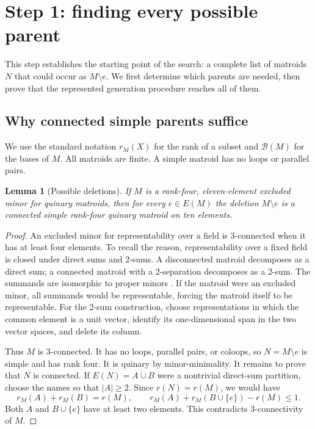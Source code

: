 \documentclass[11pt,a4paper]{article}
\newtheorem{lemma}[theorem]{Lemma}
\theoremstyle{definition}
\newcommand{\B}{\mathcal B}
\begin{document}
\section{Step 1: finding every possible parent}\label{sec:parents}

This step establishes the starting point of the search: a complete
list of matroids $N$ that could occur as $M\setminus e$. We first
determine which parents are needed, then prove that the represented
generation procedure reaches all of them.

\subsection{Why connected simple parents suffice}

We use the standard notation $r_M(X)$ for the rank of a subset and
$\B(M)$ for the bases of $M$. All matroids are finite. A simple
matroid has no loops or parallel pairs.

\begin{lemma}[Possible deletions]\label{lem:parents}
If $M$ is a rank-four, eleven-element excluded minor for quinary
matroids, then for every $e\in E(M)$ the deletion $M\setminus e$ is
a connected simple rank-four quinary matroid on ten elements.
\end{lemma}
\begin{proof}
An excluded minor for representability over a field is 3-connected
when it has at least four elements. To recall the reason,
representability over a fixed field is closed under direct sums and
2-sums. A disconnected matroid decomposes as a direct sum; a connected
matroid with a 2-separation decomposes as a 2-sum. The summands are
isomorphic to proper minors \cite{oxley}. If the matroid were an
excluded minor, all summands would be representable, forcing the
matroid itself to be representable. For the 2-sum construction, choose
representations in which the common element is a unit vector,
identify its one-dimensional span in the two vector spaces, and
delete its column.

Thus $M$ is 3-connected. It has no loops, parallel pairs, or coloops,
so $N=M\setminus e$ is simple and has rank four. It is quinary by
minor-minimality. It remains to prove that $N$ is connected. If
$E(N)=A\mathbin{\dot\cup}B$ were a nontrivial direct-sum partition,
choose the names so that $|A|\geq2$. Since $r(N)=r(M)$, we would have
\[
 r_M(A)+r_M(B)=r(M),\qquad
 r_M(A)+r_M(B\cup\{e\})-r(M)\leq1.
\]
Both $A$ and $B\cup\{e\}$ have at least two elements. This contradicts
3-connectivity of $M$.
\end{proof}
\end{document}
